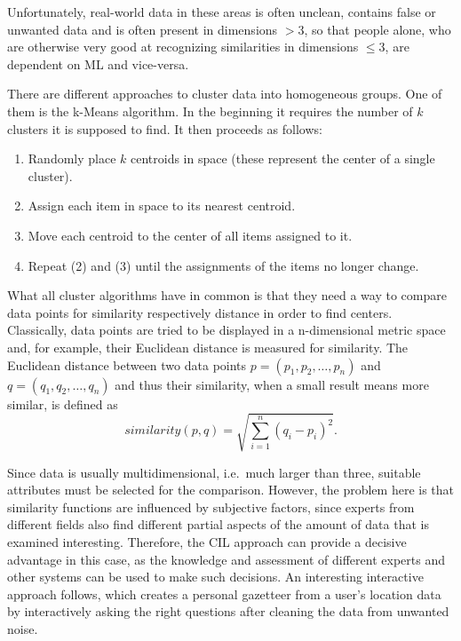 \documentclass[conference]{IEEEtran}
\begin{document}
Unfortunately, real-world data in these areas is often unclean, contains false or unwanted data and is often present in 
dimensions $>$3, so that people alone, who are otherwise very good at recognizing similarities in dimensions $\le3$, are dependent on ML and vice-versa.

There are different approaches to cluster data into homogeneous groups. One of them is the k-Means algorithm\cite{FoundationsOfML:mohri}. In the beginning it requires the number of $k$ clusters it is supposed to find. It then proceeds as follows: 
\begin{enumerate}
    \item Randomly place $k$ centroids in space (these represent the center of a single cluster).
    \item Assign each item in space to its nearest centroid.
    \item Move each centroid to the center of all items assigned to it.
    \item Repeat (2) and (3) until the assignments of the items no longer change.
\end{enumerate}

What all cluster algorithms have in common is that they need a way to compare data points for similarity respectively distance 
in order to find centers.
Classically, data points are tried to be displayed in a n-dimensional metric space and, for example, their Euclidean distance is measured for similarity.
The Euclidean distance between two data points $p = (p_1, p_2, \dots, p_n)$ and $q = (q_1, q_2, \dots, q_n)$ and thus their
similarity, when a small result means more similar, is defined as
\begin{equation*}
    similarity(p, q) = \sqrt{\sum_{i=1}^{n} (q_i - p_i)^{2}}.
\end{equation*}

Since data is usually multidimensional, i.e.\ much larger than three, suitable attributes must be selected for the comparison. 
However, the problem here is that similarity functions are influenced by subjective factors, since experts from different 
fields also find different partial aspects of the amount of data that is examined interesting.
Therefore, the CIL approach can provide a decisive advantage in this case, as the knowledge and assessment of 
different experts and other systems can be used to make such decisions.
An interesting interactive approach follows\cite{DJ:frankowski}, which creates a personal gazetteer from a user's location data 
by interactively asking the right questions after cleaning the data from unwanted noise.
\end{document}
